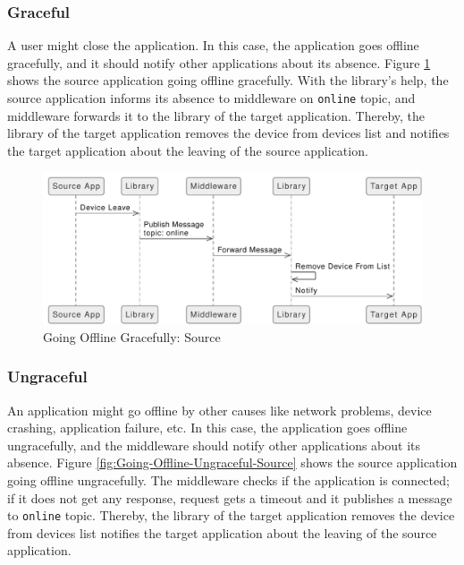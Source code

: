 \subsubsection{Graceful}
A user might close the application. In this case, the application goes offline gracefully, and it should notify other applications about its absence. Figure \ref{fig:Going-Offline-Graceful-Source} shows the source application going offline gracefully. With the library's help, the source application informs its absence to middleware on \lstinline[basicstyle=\ttfamily]{online} topic, and middleware forwards it to the library of the target application. Thereby, the library of the target application removes the device from devices list and notifies the target application about the leaving of the source application. 

\FloatBarrier \begin{figure}[H]
    \includegraphics[width=\linewidth]{../figures/Going-Offline-Graceful-Source.pdf}
    \centering
    \caption{Going Offline Gracefully: Source}
    \label{fig:Going-Offline-Graceful-Source}
\end{figure} \FloatBarrier

\subsubsection{Ungraceful}
An application might go offline by other causes like network problems, device crashing, application failure, etc. In this case, the application goes offline ungracefully, and the middleware should notify other applications about its absence. Figure \ref{fig:Going-Offline-Ungraceful-Source} shows the source application going offline ungracefully. The middleware checks if the application is connected; if it does not get any response, request gets a timeout and it publishes a message to  \lstinline[basicstyle=\ttfamily]{online} topic. Thereby, the library of the target application removes the device from devices list notifies the target application about the leaving of the source application.


